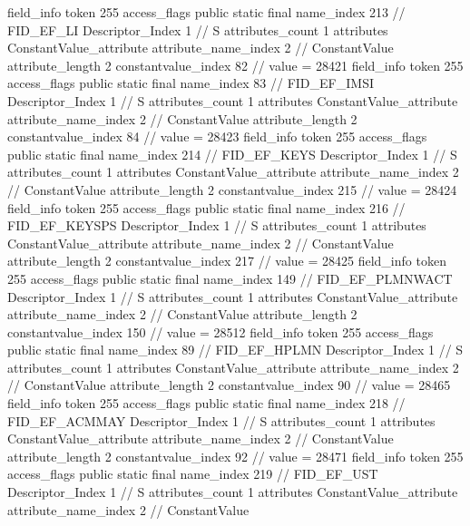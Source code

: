 {{{{{{{				}
				}
			}
			field_info {
				token	255
				access_flags	public static final
				name_index	213		// FID_EF_LI
				Descriptor_Index	1		// S
				attributes_count	1
				attributes {
				ConstantValue_attribute {
					attribute_name_index	2		// ConstantValue
					attribute_length	2
					constantvalue_index	82		// value = 28421
				}
				}
			}
			field_info {
				token	255
				access_flags	public static final
				name_index	83		// FID_EF_IMSI
				Descriptor_Index	1		// S
				attributes_count	1
				attributes {
				ConstantValue_attribute {
					attribute_name_index	2		// ConstantValue
					attribute_length	2
					constantvalue_index	84		// value = 28423
				}
				}
			}
			field_info {
				token	255
				access_flags	public static final
				name_index	214		// FID_EF_KEYS
				Descriptor_Index	1		// S
				attributes_count	1
				attributes {
				ConstantValue_attribute {
					attribute_name_index	2		// ConstantValue
					attribute_length	2
					constantvalue_index	215		// value = 28424
				}
				}
			}
			field_info {
				token	255
				access_flags	public static final
				name_index	216		// FID_EF_KEYSPS
				Descriptor_Index	1		// S
				attributes_count	1
				attributes {
				ConstantValue_attribute {
					attribute_name_index	2		// ConstantValue
					attribute_length	2
					constantvalue_index	217		// value = 28425
				}
				}
			}
			field_info {
				token	255
				access_flags	public static final
				name_index	149		// FID_EF_PLMNWACT
				Descriptor_Index	1		// S
				attributes_count	1
				attributes {
				ConstantValue_attribute {
					attribute_name_index	2		// ConstantValue
					attribute_length	2
					constantvalue_index	150		// value = 28512
				}
				}
			}
			field_info {
				token	255
				access_flags	public static final
				name_index	89		// FID_EF_HPLMN
				Descriptor_Index	1		// S
				attributes_count	1
				attributes {
				ConstantValue_attribute {
					attribute_name_index	2		// ConstantValue
					attribute_length	2
					constantvalue_index	90		// value = 28465
				}
				}
			}
			field_info {
				token	255
				access_flags	public static final
				name_index	218		// FID_EF_ACMMAY
				Descriptor_Index	1		// S
				attributes_count	1
				attributes {
				ConstantValue_attribute {
					attribute_name_index	2		// ConstantValue
					attribute_length	2
					constantvalue_index	92		// value = 28471
				}
				}
			}
			field_info {
				token	255
				access_flags	public static final
				name_index	219		// FID_EF_UST
				Descriptor_Index	1		// S
				attributes_count	1
				attributes {
				ConstantValue_attribute {
					attribute_name_index	2		// ConstantValue
}}}}}}}
